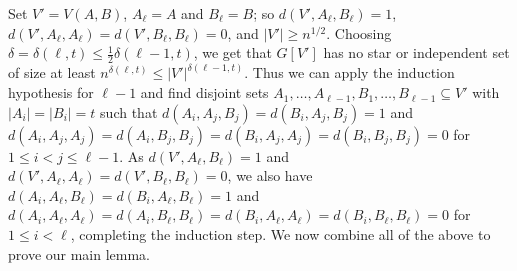 \documentclass[11pt]{article}
\let\oldendproof\endproof
\renewenvironment{proof}[1][\proofname]{%
	\oldproof[\bf #1]%
}{\oldendproof}
\theoremstyle{plain}
\begin{document}
\begin{proof}
    Set $V'=V(A, B)$, $A_{\ell} = A$ and $B_{\ell} = B$; so $d(V',A_{\ell},B_{\ell}) = 1$, $d(V',A_{\ell},A_{\ell}) = d(V',B_{\ell},B_{\ell}) = 0$, and $|V'| \geq n^{1/2}$. 
    Choosing $\delta = \delta(\ell,t) \leq \frac{1}{2}\delta(\ell-1,t)$, we get that 
    $G[V']$ has no star or independent set of size at least 
    $n^{\delta(\ell,t)} \leq |V'|^{\delta(\ell-1,t)}$.
    Thus we can apply the induction hypothesis for $\ell-1$ and find disjoint sets $A_1, \dots, A_{\ell-1}, B_1, \dots, B_{\ell-1} \subseteq V'$ with $|A_i|=|B_i|=t$ such that $d(A_i,A_j,B_j) = d(B_i,A_j,B_j) = 1$ and $d(A_i,A_j,A_j) = d(A_i,B_j,B_j) = d(B_i,A_j,A_j) = d(B_i,B_j,B_j) = 0$ for $1 \leq i<j \leq \ell-1$. As $d(V',A_{\ell},B_{\ell}) = 1$ and $d(V',A_{\ell},A_{\ell}) = d(V',B_{\ell},B_{\ell}) = 0$, we also have $d(A_i,A_{\ell},B_{\ell}) = d(B_i,A_{\ell},B_{\ell}) = 1$ and $d(A_i,A_{\ell},A_{\ell}) = d(A_i,B_{\ell},B_{\ell}) = d(B_i,A_{\ell},A_{\ell}) = d(B_i,B_{\ell},B_{\ell}) = 0$ for $1 \leq i< \ell$, completing the induction step.
\end{proof}
\noindent
We now combine all of the above to prove our main lemma. 
\end{document}
